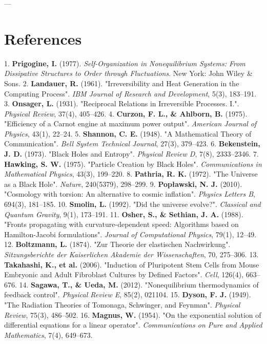 \documentclass[11pt,a4paper]{article}
\theoremstyle{definition}
\theoremstyle{remark}
\begin{document}
---

\section{References}

1. \textbf{Prigogine, I.} (1977). \textit{Self-Organization in Nonequilibrium Systems: From Dissipative Structures to Order through Fluctuations}. New York: John Wiley \& Sons.
2. \textbf{Landauer, R.} (1961). "Irreversibility and Heat Generation in the Computing Process". \textit{IBM Journal of Research and Development}, 5(3), 183–191.
3. \textbf{Onsager, L.} (1931). "Reciprocal Relations in Irreversible Processes. I.". \textit{Physical Review}, 37(4), 405–426.
4. \textbf{Curzon, F. L., \& Ahlborn, B.} (1975). "Efficiency of a Carnot engine at maximum power output". \textit{American Journal of Physics}, 43(1), 22–24.
5. \textbf{Shannon, C. E.} (1948). "A Mathematical Theory of Communication". \textit{Bell System Technical Journal}, 27(3), 379–423.
6. \textbf{Bekenstein, J. D.} (1973). "Black Holes and Entropy". \textit{Physical Review D}, 7(8), 2333–2346.
7. \textbf{Hawking, S. W.} (1975). "Particle Creation by Black Holes". \textit{Communications in Mathematical Physics}, 43(3), 199–220.
8. \textbf{Pathria, R. K.} (1972). "The Universe as a Black Hole". \textit{Nature}, 240(5379), 298–299.
9. \textbf{Popławski, N. J.} (2010). "Cosmology with torsion: An alternative to cosmic inflation". \textit{Physics Letters B}, 694(3), 181–185.
10. \textbf{Smolin, L.} (1992). "Did the universe evolve?". \textit{Classical and Quantum Gravity}, 9(1), 173–191.
11. \textbf{Osher, S., \& Sethian, J. A.} (1988). "Fronts propagating with curvature-dependent speed: Algorithms based on Hamilton-Jacobi formulations". \textit{Journal of Computational Physics}, 79(1), 12–49.
12. \textbf{Boltzmann, L.} (1874). "Zur Theorie der elastischen Nachwirkung". \textit{Sitzungsberichte der Kaiserlichen Akademie der Wissenschaften}, 70, 275–306.
13. \textbf{Takahashi, K., et al.} (2006). "Induction of Pluripotent Stem Cells from Mouse Embryonic and Adult Fibroblast Cultures by Defined Factors". \textit{Cell}, 126(4), 663–676.
14. \textbf{Sagawa, T., \& Ueda, M.} (2012). "Nonequilibrium thermodynamics of feedback control". \textit{Physical Review E}, 85(2), 021104.
15. \textbf{Dyson, F. J.} (1949). "The Radiation Theories of Tomonaga, Schwinger, and Feynman". \textit{Physical Review}, 75(3), 486–502.
16. \textbf{Magnus, W.} (1954). "On the exponential solution of differential equations for a linear operator". \textit{Communications on Pure and Applied Mathematics}, 7(4), 649–673.
\end{document}
